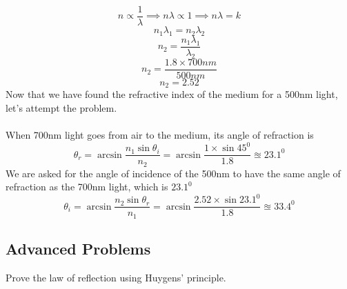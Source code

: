 \documentclass[11pt,addpoints]{exam}
\begin{document}
\begin{questions}
		$$n\propto\dfrac{1}{\lambda}\implies n\lambda\propto1\implies n\lambda=k$$
		$$n_1\lambda_1=n_2\lambda_2$$
		$$n_2=\dfrac{n_1\lambda_1}{\lambda_2}$$
		$$n_2=\dfrac{1.8\times700nm}{500nm}$$
		$$n_2=2.52$$
		Now that we have found the refractive index of the medium for a 500nm light, let's attempt the problem. \\ \\
		When 700nm light goes from air to the medium, its angle of refraction is
		$$\theta_r=\arcsin\dfrac{n_1\sin\theta_i}{n_2}=\arcsin\dfrac{1\times\sin45^0}{1.8}\approxeq23.1^0$$
		We are asked for the angle of incidence of the 500nm to have the same angle of refraction as the 700nm light, which is $23.1^0$
		$$\theta_i=\arcsin\dfrac{n_2\sin\theta_r}{n_1}=\arcsin\dfrac{2.52\times\sin23.1^0}{1.8}\approxeq33.4^0$$
		\subsection*{Advanced Problems}
		\question Prove the law of reflection using Huygens' principle.
	\end{questions}		
\end{document}
